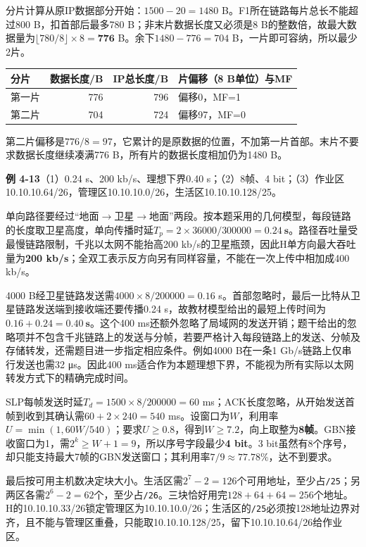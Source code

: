 \documentclass{sidenotes-simplex}
\begin{document}
分片计算从原IP数据部分开始：\(1500-20=1480\) B。F1所在链路每片总长不能超过800 B，扣首部后最多780 B；非末片数据长度又必须是8 B的整数倍，故最大数据量为\(\lfloor780/8\rfloor\times8=\mathbf{776}\) B。余下\(1480-776=704\) B，一片即可容纳，所以最少2片。

\begin{longtable}[]{@{}lrrl@{}}
\toprule\noalign{}
分片 & 数据长度/B & IP总长度/B & 片偏移（8 B单位）与MF \\
\midrule\noalign{}
\endhead
\bottomrule\noalign{}
\endlastfoot
第一片 & 776 & 796 & 偏移0，MF=1 \\
第二片 & 704 & 724 & 偏移97，MF=0 \\
\end{longtable}

第二片偏移是\(776/8=97\)，它累计的是原数据的位置，不加第一片首部。末片不要求数据长度继续凑满776 B，所有片的数据长度相加仍为1480 B。

\par\medskip\Needspace{30.00mm}\noindent{}\label{a:CN04-E13}\textbf{例 4-13}\quad （1）0.24 s、200 kb/s、理想下界0.40 s；（2）8帧、4 bit；（3）作业区10.10.10.64/26，管理区10.10.10.0/26，生活区10.10.10.128/25。
\par\smallskip
单向路径要经过``地面\ensuremath{\to}卫星\ensuremath{\to}地面''两段。按本题采用的几何模型，每段链路的长度取卫星高度，单向传播时延\(T_p=2\times36000/300000=\mathbf{0.24\ s}\)。路径吞吐量受最慢链路限制，千兆以太网不能抬高200 kb/s的卫星瓶颈，因此H单方向最大吞吐量为\textbf{200 kb/s}；全双工表示反方向另有同样容量，不能在一次上传中相加成400 kb/s。

4000 B经卫星链路发送需\(4000\times8/200000=0.16\) s。首部忽略时，最后一比特从卫星链路发送端到接收端还要传播0.24 s，故教材模型给出的最短上传时间为\(0.16+0.24=\mathbf{0.40\ s}\)。这个400 ms还额外忽略了局域网的发送开销；题干给出的忽略项并不包含千兆链路上的发送与分帧，若要严格计入每段链路上的发送、分帧及存储转发，还需题目进一步指定相应条件。例如4000 B在一条1 Gb/s链路上仅串行发送也需32 μs。因此400 ms适合作为本题理想下界，不能视为所有实际以太网转发方式下的精确完成时间。

SLP每帧发送时延\(T_d=1500\times8/200000=60\) ms；ACK长度忽略，从开始发送首帧到收到其确认需\(60+2\times240=540\) ms。设窗口为\(W\)，利用率\(U=\min(1,60W/540)\)；要求\(U\ge0.8\)，得到\(W\ge7.2\)，向上取整为\textbf{8帧}。GBN接收窗口为1，需\(2^k\ge W+1=9\)，所以序号字段最少\textbf{4 bit}。3 bit虽然有8个序号，却只能支持最大7帧的GBN发送窗口；其利用率\(7/9\approx77.78\%\)，达不到要求。

最后按可用主机数决定块大小。生活区需\(2^7-2=126\)个可用地址，至少占\texttt{/25}；另两区各需\(2^6-2=62\)个，至少占\texttt{/26}。三块恰好用完\(128+64+64=256\)个地址。H的10.10.10.33/26锁定管理区为10.10.10.0/26；生活区的\texttt{/25}必须按128地址边界对齐，且不能与管理区重叠，只能取10.10.10.128/25，留下10.10.10.64/26给作业区。
\end{document}
